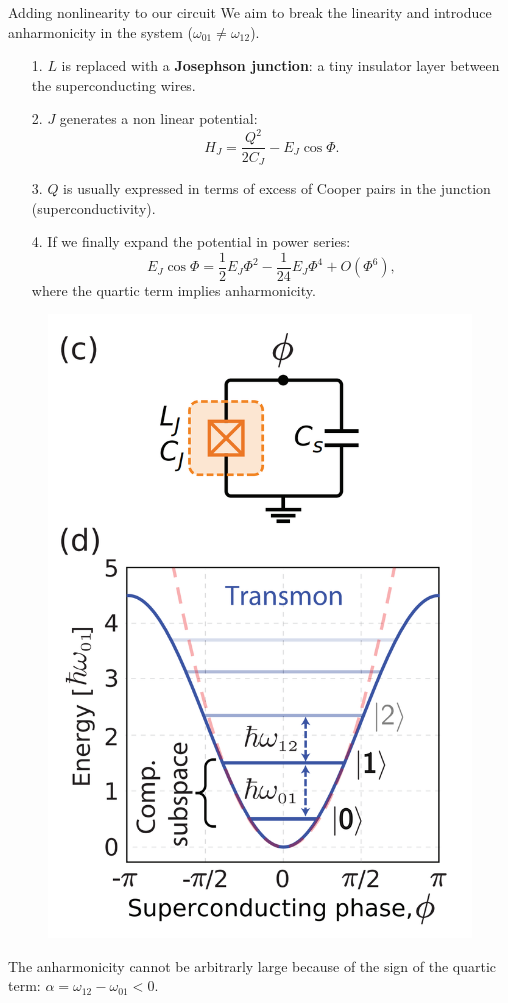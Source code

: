 \documentclass[aspectratio=169, 8pt, xcolor={svgnames}, hyperref={linkcolor=black}]{beamer}
\begin{document}
\begin{frame}{Adding nonlinearity to our circuit}
We aim to break the linearity and introduce anharmonicity in the system ($\omega_{01}\neq \omega_{12}$).
\begin{multicols}{2}
\begin{itemize}[noitemsep]
\item[1.] $L$ is replaced with a \textcolor{deepcarrotorange}{\textbf{Josephson junction}}: a tiny insulator 
layer between the superconducting wires.
\item[2.] $J$ generates a non linear potential:
$$ H_J =  \frac{Q^2}{2C_{J}} - E_J \cos \Phi.  $$
\item[3.] $Q$ is usually expressed in terms of excess of Cooper 
pairs in the junction (superconductivity).
\item[4.] If we finally expand the potential in power series:
$$ E_J \cos \Phi = \frac{1}{2}E_J \Phi^2 - \frac{1}{24} E_J \Phi^4 + O(\Phi^6), $$
where the quartic term implies anharmonicity. 
\end{itemize}
\begin{figure}
   \includegraphics[width=0.6\linewidth]{figures/jos.png}
\end{figure} 
\end{multicols}
The anharmonicity cannot be arbitrarly large because of the sign of the quartic term: 
$\alpha = \omega_{12} - \omega_{01} < 0$.
\end{frame}
\end{document}
